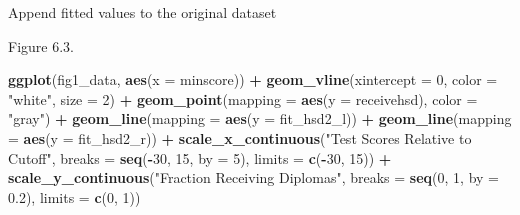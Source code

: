 \documentclass[]{book}
\newenvironment{Shaded}{\begin{snugshade}}{\end{snugshade}}
\newcommand{\KeywordTok}[1]{\textcolor[rgb]{0.13,0.29,0.53}{\textbf{#1}}}
\newcommand{\DataTypeTok}[1]{\textcolor[rgb]{0.13,0.29,0.53}{#1}}
\newcommand{\DecValTok}[1]{\textcolor[rgb]{0.00,0.00,0.81}{#1}}
\newcommand{\FloatTok}[1]{\textcolor[rgb]{0.00,0.00,0.81}{#1}}
\newcommand{\StringTok}[1]{\textcolor[rgb]{0.31,0.60,0.02}{#1}}
\newcommand{\OtherTok}[1]{\textcolor[rgb]{0.56,0.35,0.01}{#1}}
\newcommand{\OperatorTok}[1]{\textcolor[rgb]{0.81,0.36,0.00}{\textbf{#1}}}
\newcommand{\NormalTok}[1]{#1}
\theoremstyle{definition}
\theoremstyle{definition}
\theoremstyle{definition}
\theoremstyle{remark}
\begin{document}
Append fitted values to the original dataset

\begin{Shaded}
\end{Shaded}

Figure 6.3.

\begin{Shaded}
\begin{Highlighting}[]
\KeywordTok{ggplot}\NormalTok{(fig1_data, }\KeywordTok{aes}\NormalTok{(}\DataTypeTok{x =}\NormalTok{ minscore)) }\OperatorTok{+}
\StringTok{  }\KeywordTok{geom_vline}\NormalTok{(}\DataTypeTok{xintercept =} \DecValTok{0}\NormalTok{, }\DataTypeTok{color =} \StringTok{"white"}\NormalTok{, }\DataTypeTok{size =} \DecValTok{2}\NormalTok{) }\OperatorTok{+}
\StringTok{  }\KeywordTok{geom_point}\NormalTok{(}\DataTypeTok{mapping =} \KeywordTok{aes}\NormalTok{(}\DataTypeTok{y =}\NormalTok{ receivehsd), }\DataTypeTok{color =} \StringTok{"gray"}\NormalTok{) }\OperatorTok{+}
\StringTok{  }\KeywordTok{geom_line}\NormalTok{(}\DataTypeTok{mapping =} \KeywordTok{aes}\NormalTok{(}\DataTypeTok{y =}\NormalTok{ fit_hsd2_l)) }\OperatorTok{+}
\StringTok{  }\KeywordTok{geom_line}\NormalTok{(}\DataTypeTok{mapping =} \KeywordTok{aes}\NormalTok{(}\DataTypeTok{y =}\NormalTok{ fit_hsd2_r)) }\OperatorTok{+}
\StringTok{  }\KeywordTok{scale_x_continuous}\NormalTok{(}\StringTok{"Test Scores Relative to Cutoff"}\NormalTok{,}
                     \DataTypeTok{breaks =} \KeywordTok{seq}\NormalTok{(}\OperatorTok{-}\DecValTok{30}\NormalTok{, }\DecValTok{15}\NormalTok{, }\DataTypeTok{by =} \DecValTok{5}\NormalTok{), }\DataTypeTok{limits =} \KeywordTok{c}\NormalTok{(}\OperatorTok{-}\DecValTok{30}\NormalTok{, }\DecValTok{15}\NormalTok{)) }\OperatorTok{+}
\StringTok{  }\KeywordTok{scale_y_continuous}\NormalTok{(}\StringTok{"Fraction Receiving Diplomas"}\NormalTok{,}
                     \DataTypeTok{breaks =} \KeywordTok{seq}\NormalTok{(}\DecValTok{0}\NormalTok{, }\DecValTok{1}\NormalTok{, }\DataTypeTok{by =} \FloatTok{0.2}\NormalTok{), }\DataTypeTok{limits =} \KeywordTok{c}\NormalTok{(}\DecValTok{0}\NormalTok{, }\DecValTok{1}\NormalTok{))}
\end{Highlighting}
\end{Shaded}
\end{document}
